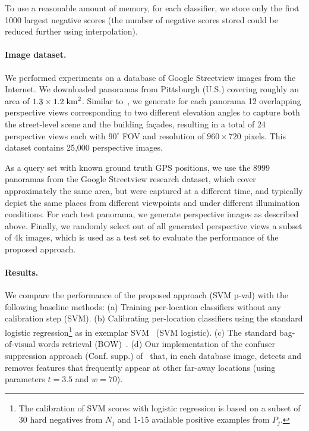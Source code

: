       To use a reasonable amount of memory, for each classifier, we store only the first 1000 largest negative scores (the number of negative scores stored could be reduced further using interpolation).
   \paragraph{Image dataset.}
      We performed experiments on a database of Google Streetview images from the Internet. We downloaded panoramas from Pittsburgh (U.S.) covering roughly an area of $1.3 \times 1.2 \; {\rm km}^2$. Similar to~\cite{Chen11}, we generate for each panorama 12 overlapping perspective views corresponding to two different elevation angles to capture both the street-level scene and the building fa\c{c}ades, resulting in a total of 24 perspective views each with $90^\circ$ FOV and resolution of $960 \times 720$ pixels. This dataset contains 25,000 perspective images.

      As a query set with known ground truth GPS positions, we use the 8999 panoramas from the Google Streetview research dataset, which cover approximately the same area, but were captured at a different time, and typically depict the same places from different viewpoints and under different illumination conditions. For each test panorama, we generate perspective images as described above. Finally, we randomly select out of all generated perspective views a subset of 4k images, which is used as a test set to evaluate the performance of the proposed approach.

   \paragraph{Results.}
      We compare the performance of the proposed approach (SVM p-val) with the following baseline methods: (a) Training per-location classifiers without any calibration step (SVM). (b) Calibrating per-location classifiers using the standard logistic regression\footnote
         {
         The calibration of SVM scores with logistic regression is based on a subset of 30 hard negatives from $N_j$ and 1-15 available positive examples from $P_j$.
         } 
      as in exemplar SVM~\cite{Malisiewicz11} (SVM logistic). (c) The standard bag-of-visual words retrieval (BOW)~\cite{Philbin07}. (d) Our implementation of the confuser suppression  approach (Conf. supp.) of~\cite{Knopp2010} that, in each database image, detects and removes features that frequently appear at other far-away locations (using parameters $t=3.5$ and $w=70$).

